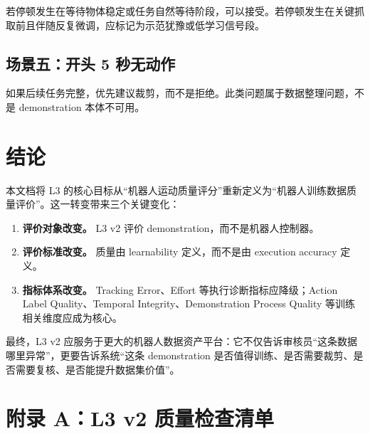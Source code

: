 \documentclass[UTF8,zihao=-4]{ctexart}
\begin{document}
若停顿发生在等待物体稳定或任务自然等待阶段，可以接受。若停顿发生在关键抓取前且伴随反复微调，应标记为示范犹豫或低学习信号段。

\subsection{场景五：开头 5 秒无动作}

如果后续任务完整，优先建议裁剪，而不是拒绝。此类问题属于数据整理问题，不是 demonstration 本体不可用。

\section{结论}

本文档将 L3 的核心目标从“机器人运动质量评分”重新定义为“机器人训练数据质量评价”。这一转变带来三个关键变化：

\begin{enumerate}
  \item \textbf{评价对象改变。} L3 v2 评价 demonstration，而不是机器人控制器。
  \item \textbf{评价标准改变。} 质量由 learnability 定义，而不是由 execution accuracy 定义。
  \item \textbf{指标体系改变。} Tracking Error、Effort 等执行诊断指标应降级；Action Label Quality、Temporal Integrity、Demonstration Process Quality 等训练相关维度应成为核心。
\end{enumerate}

最终，L3 v2 应服务于更大的机器人数据资产平台：它不仅告诉审核员“这条数据哪里异常”，更要告诉系统“这条 demonstration 是否值得训练、是否需要裁剪、是否需要复核、是否能提升数据集价值”。

\newpage
\appendix

\section{附录 A：L3 v2 质量检查清单}
\end{document}
